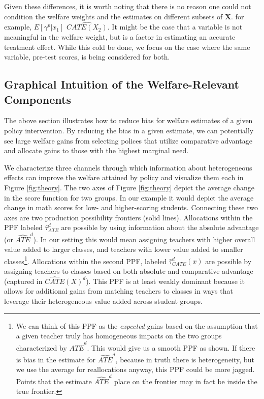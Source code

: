 \documentclass[12pt]{article}
\theoremstyle{definition}
\theoremstyle{definition}
\theoremstyle{definition}
\theoremstyle{definition}
\begin{document}
   Given these differences, it is worth noting that there is no reason one could not condition the welfare weights and the estimates on different subsets of $\bm{X}$. for example, $E[\gamma^p|x_1]$ $\widehat{CATE(X_2)}$. It might be the case that a variable is not meaningful in the welfare weight, but is a factor in estimating an accurate treatment effect. While this cold be done, we focus on the case where the same variable, pre-test scores, is being considered for both. 
   

\subsection{Graphical Intuition of the Welfare-Relevant Components}

The above section illustrates how to reduce bias for welfare estimates of a given policy intervention. By reducing the bias in a given estimate, we can potentially see large welfare gains from selecting polices that utilize comparative advantage and allocate gains to those with the highest marginal need. 

    

We characterize three channels through which information about heterogeneous effects can improve the welfare attained by policy and visualize them each in Figure \ref{fig:theory}. The two axes of Figure \ref{fig:theory} depict the average change in the score function for two groups. In our example it would depict the average change in math scores for low- and higher-scoring students. Connecting these two axes are two production possibility frontiers (solid lines). Allocations within the PPF labeled $\hat{\tau}^d_{ATE}$ are possible by using information about the absolute advantage (or $\widehat{ATE}^d$). In our setting this would mean assigning teachers with higher overall value added to larger classes, and teachers with lower value added to smaller classes\footnote{ We can think of this PPF as the \textit{expected} gains based on the assumption that a given teacher truly has homogeneous impacts on the two groups characterized by $\widehat{ATE}^d$. This would give us a smooth PPF as shown. If there is bias in the estimate for $\widehat{ATE}^d$, because in truth there is heterogeneity, but we use the average for reallocations anyway, this PPF could be more jagged. Points that the estimate $\widehat{ATE}^d$ place on the frontier may in fact be inside the true frontier. }.  Allocations within the second PPF, labeled $\hat{\tau}^d_{CATE}(x)$ are possible by assigning teachers to classes based on both absolute and comparative advantage (captured in $\widehat{CATE}(X)^d$). This PPF is at least weakly dominant because it allows for additional gains from matching teachers to classes in ways that leverage their heterogeneous value added across student groups.
\end{document}
